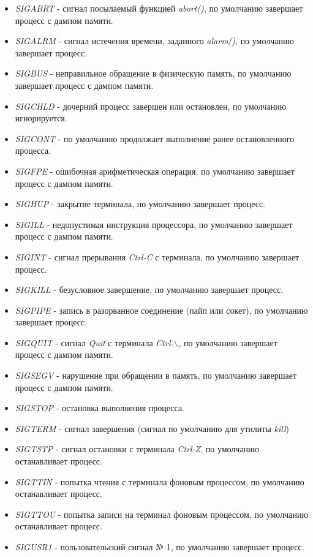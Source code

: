 \documentclass[14pt,a4paper,report]{report}
\begin{document}
\begin{itemize}
	\item \emph{SIGABRT} - сигнал посылаемый функцией \emph{abort()}, по умолчанию завершает процесс с дампом памяти.	
	\item \emph{SIGALRM} - 	сигнал истечения времени, заданного \emph{alarm()}, по умолчанию завершает процесс.
	\item \emph{SIGBUS} - 	неправильное обращение в физическую память, по умолчанию завершает процесс с дампом памяти.	
	\item \emph{SIGCHLD} - дочерний процесс завершен или остановлен, по умолчанию игнорируется.	
	\item \emph{SIGCONT} -  по умолчанию продолжает выполнение ранее остановленного процесса.
	\item \emph{SIGFPE} - ошибочная арифметическая операция, по умолчанию завершает процесс с дампом памяти.		
	\item \emph{SIGHUP} - закрытие терминала, по умолчанию завершает процесс.	
	\item \emph{SIGILL} - недопустимая инструкция процессора, по умолчанию завершает процесс с дампом памяти.		
	\item \emph{SIGINT} - сигнал прерывания \emph{Ctrl-C} с терминала, по умолчанию завершает процесс.	
	\item \emph{SIGKILL} - безусловное завершение, по умолчанию завершает процесс.	
	\item \emph{SIGPIPE} - запись в разорванное соединение (пайп или сокет), по умолчанию завершает процесс.	
	\item \emph{SIGQUIT} - сигнал \emph{Quit} с терминала \emph{Ctrl-$\backslash$}, по умолчанию завершает процесс с дампом памяти.		
	\item \emph{SIGSEGV} - нарушение при обращении в память, по умолчанию завершает процесс с дампом памяти.		
	\item \emph{SIGSTOP} - остановка выполнения процесса.	
	\item \emph{SIGTERM} - сигнал завершения (сигнал по умолчанию для утилиты \emph{kill})
	\item \emph{SIGTSTP} - сигнал остановки с терминала \emph{Ctrl-Z}, по умолчанию останавливает процесс.
	\item \emph{SIGTTIN} - попытка чтения с терминала фоновым процессом, по умолчанию останавливает процесс.	
	\item \emph{SIGTTOU} - попытка записи на терминал фоновым процессом, по умолчанию останавливает процесс.	
	\item \emph{SIGUSR1} - пользовательский сигнал № 1, по умолчанию завершает процесс.	

\end{itemize}
\end{document}

